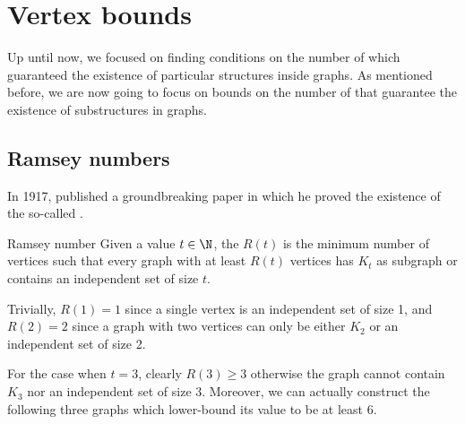 \documentclass[a4paper, 12pt]{report}
\begin{document}
    \section{Vertex bounds}

    Up until now, we focused on finding conditions on the number of  which guaranteed the existence of particular structures inside graphs. As mentioned before, we are now going to focus on bounds on the number of  that guarantee the existence of substructures in graphs.

    \subsection{Ramsey numbers}

    In 1917, \textcite{ramsey} published a groundbreaking paper in which he proved the existence of the so-called .

    \begin{frameddefn}{Ramsey number}
        Given a value $t \in \N$, the  $R(t)$ is the minimum number of vertices such that every graph with at least $R(t)$ vertices has $K_t$ as subgraph or contains an independent set of size $t$.
    \end{frameddefn}

    Trivially, $R(1) = 1$ since a single vertex is an independent set of size 1, and $R(2) = 2$ since a graph with two vertices can only be either $K_2$ or an independent set of size 2.

    For the case when $t = 3$, clearly $R(3) \ge 3$ otherwise the graph cannot contain $K_3$ nor an independent set of size 3. Moreover, we can actually construct the following three graphs which lower-bound its value to be at least 6.
\end{document}
